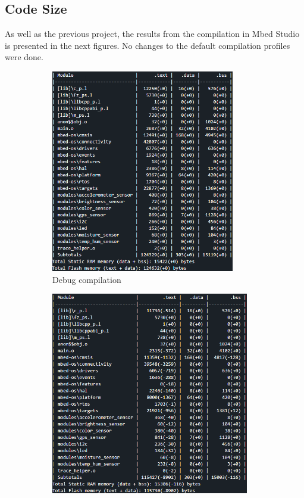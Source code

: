 \clearpage
\subsection{Code Size}
As well as the previous project, the results from the compilation in Mbed Studio is presented in the next figures. No changes to the default compilation profiles were done. 
\begin{figure}[H]
    \centering
    \begin{subfigure}[t]{0.45\textwidth}
        \centering
        \includegraphics[width=0.882\textwidth]{images/8/debugSize.png}
        \caption{Debug compilation}
    \end{subfigure}
    \begin{subfigure}[t]{0.45\textwidth}
        \centering
        \includegraphics[width=0.95\textwidth]{images/8/developSize.png}

\end{subfigure}
\end{figure}
